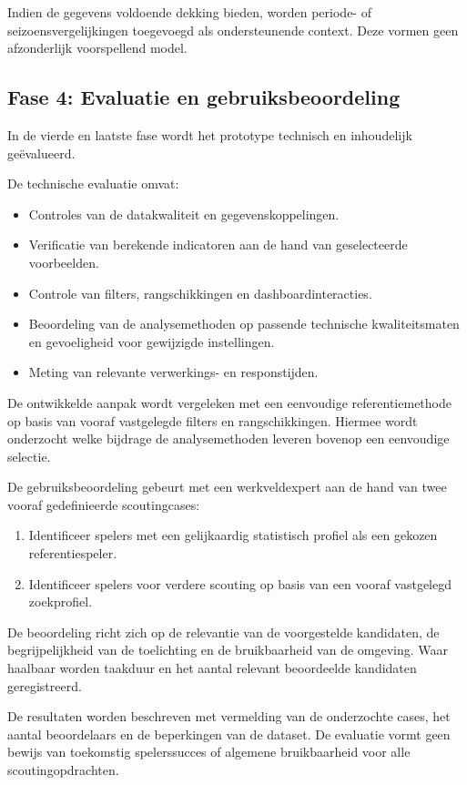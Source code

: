 Indien de gegevens voldoende dekking bieden, worden periode- of seizoensvergelijkingen toegevoegd als ondersteunende context. Deze vormen geen afzonderlijk voorspellend model.

\subsection{Fase 4: Evaluatie en gebruiksbeoordeling}

In de vierde en laatste fase wordt het prototype technisch en inhoudelijk geëvalueerd.

De technische evaluatie omvat:
\begin{itemize}
  \item Controles van de datakwaliteit en gegevenskoppelingen.
  \item Verificatie van berekende indicatoren aan de hand van geselecteerde voorbeelden.
  \item Controle van filters, rangschikkingen en dashboardinteracties.
  \item Beoordeling van de analysemethoden op passende technische kwaliteitsmaten en gevoeligheid voor gewijzigde instellingen.
  \item Meting van relevante verwerkings- en responstijden.
\end{itemize}

De ontwikkelde aanpak wordt vergeleken met een eenvoudige referentiemethode op basis van vooraf vastgelegde filters en rangschikkingen. Hiermee wordt onderzocht welke bijdrage de analysemethoden leveren bovenop een eenvoudige selectie.

De gebruiksbeoordeling gebeurt met een werkveldexpert aan de hand van twee vooraf gedefinieerde scoutingcases:
\begin{enumerate}
  \item Identificeer spelers met een gelijkaardig statistisch profiel als een gekozen referentiespeler.
  \item Identificeer spelers voor verdere scouting op basis van een vooraf vastgelegd zoekprofiel.
\end{enumerate}

De beoordeling richt zich op de relevantie van de voorgestelde kandidaten, de begrijpelijkheid van de toelichting en de bruikbaarheid van de omgeving. Waar haalbaar worden taakduur en het aantal relevant beoordeelde kandidaten geregistreerd.

De resultaten worden beschreven met vermelding van de onderzochte cases, het aantal beoordelaars en de beperkingen van de dataset. De evaluatie vormt geen bewijs van toekomstig spelerssucces of algemene bruikbaarheid voor alle scoutingopdrachten.

